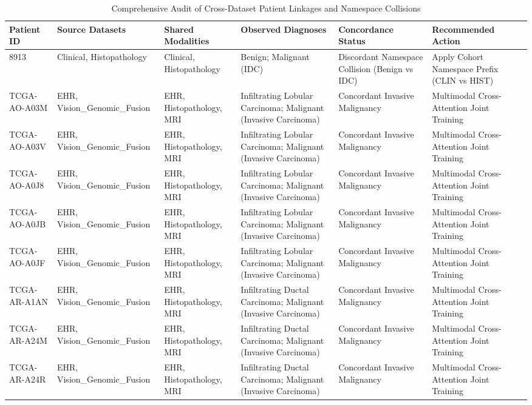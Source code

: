\begin{table}
\caption{Comprehensive Audit of Cross-Dataset Patient Linkages and Namespace Collisions}
\label{tab:table_p2_cross_dataset_overlap}
\begin{tabular}{llllll}
\toprule
Patient ID & Source Datasets & Shared Modalities & Observed Diagnoses & Concordance Status & Recommended Action \\
\midrule
8913 & Clinical, Histopathology & Clinical, Histopathology & Benign; Malignant (IDC) & Discordant Namespace Collision (Benign vs IDC) & Apply Cohort Namespace Prefix (CLIN vs HIST) \\
TCGA-AO-A03M & EHR, Vision\_Genomic\_Fusion & EHR, Histopathology, MRI & Infiltrating Lobular Carcinoma; Malignant (Invasive Carcinoma) & Concordant Invasive Malignancy & Multimodal Cross-Attention Joint Training \\
TCGA-AO-A03V & EHR, Vision\_Genomic\_Fusion & EHR, Histopathology, MRI & Infiltrating Lobular Carcinoma; Malignant (Invasive Carcinoma) & Concordant Invasive Malignancy & Multimodal Cross-Attention Joint Training \\
TCGA-AO-A0J8 & EHR, Vision\_Genomic\_Fusion & EHR, Histopathology, MRI & Infiltrating Lobular Carcinoma; Malignant (Invasive Carcinoma) & Concordant Invasive Malignancy & Multimodal Cross-Attention Joint Training \\
TCGA-AO-A0JB & EHR, Vision\_Genomic\_Fusion & EHR, Histopathology, MRI & Infiltrating Lobular Carcinoma; Malignant (Invasive Carcinoma) & Concordant Invasive Malignancy & Multimodal Cross-Attention Joint Training \\
TCGA-AO-A0JF & EHR, Vision\_Genomic\_Fusion & EHR, Histopathology, MRI & Infiltrating Lobular Carcinoma; Malignant (Invasive Carcinoma) & Concordant Invasive Malignancy & Multimodal Cross-Attention Joint Training \\
TCGA-AR-A1AN & EHR, Vision\_Genomic\_Fusion & EHR, Histopathology, MRI & Infiltrating Ductal Carcinoma; Malignant (Invasive Carcinoma) & Concordant Invasive Malignancy & Multimodal Cross-Attention Joint Training \\
TCGA-AR-A24M & EHR, Vision\_Genomic\_Fusion & EHR, Histopathology, MRI & Infiltrating Ductal Carcinoma; Malignant (Invasive Carcinoma) & Concordant Invasive Malignancy & Multimodal Cross-Attention Joint Training \\
TCGA-AR-A24R & EHR, Vision\_Genomic\_Fusion & EHR, Histopathology, MRI & Infiltrating Ductal Carcinoma; Malignant (Invasive Carcinoma) & Concordant Invasive Malignancy & Multimodal Cross-Attention Joint Training \\

\end{tabular}
\end{table}
